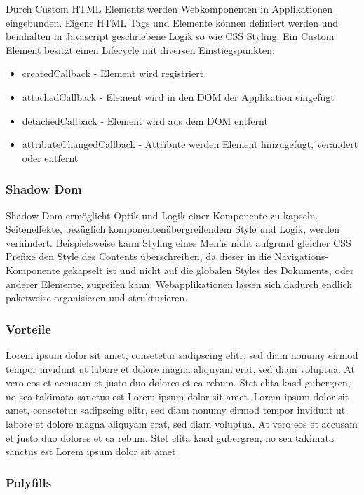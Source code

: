 Durch Custom HTML Elements werden Webkomponenten in Applikationen eingebunden.
Eigene HTML Tags und Elemente können definiert werden und beinhalten in Javascript geschriebene Logik so wie CSS Styling.
Ein Custom Element besitzt einen Lifecycle mit diversen Einstiegspunkten:

\begin{itemize}
\item createdCallback - Element wird registriert
\item attachedCallback - Element wird in den DOM der Applikation eingefügt
\item detachedCallback - Element wird aus dem DOM entfernt
\item attributeChangedCallback - Attribute werden Element hinzugefügt, verändert oder entfernt
\end{itemize}


\subsubsection{Shadow Dom}
Shadow Dom ermöglicht Optik und Logik einer Komponente zu kapseln.
Seiteneffekte, bezüglich komponentenübergreifendem Style und Logik, werden verhindert.
Beispielsweise kann Styling eines Menüs nicht aufgrund gleicher CSS Prefixe den Style des Contents überschreiben,
da dieser in die Navigations-Komponente gekapselt ist und nicht auf die globalen Styles des Dokuments, oder anderer Elemente, zugreifen kann.
Webapplikationen lassen sich dadurch endlich paketweise organisieren und strukturieren.

\subsubsection{Vorteile}
Lorem ipsum dolor sit amet, consetetur sadipscing elitr, sed diam nonumy eirmod tempor invidunt ut labore et dolore magna aliquyam erat, sed diam voluptua. At vero eos et accusam et justo duo dolores et ea rebum. Stet clita kasd gubergren, no sea takimata sanctus est Lorem ipsum dolor sit amet. Lorem ipsum dolor sit amet, consetetur sadipscing elitr, sed diam nonumy eirmod tempor invidunt ut labore et dolore magna aliquyam erat, sed diam voluptua. At vero eos et accusam et justo duo dolores et ea rebum. Stet clita kasd gubergren, no sea takimata sanctus est Lorem ipsum dolor sit amet.

\subsubsection{Polyfills}

